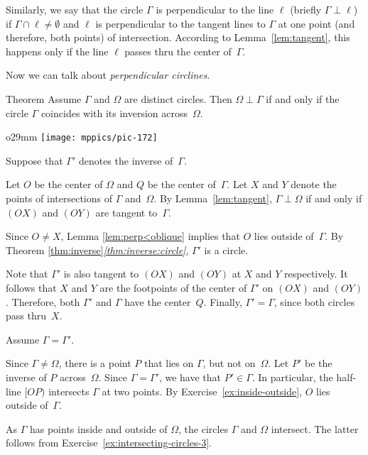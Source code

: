 Similarly, we say that the circle $\Gamma$ is perpendicular to the line $\ell$ (briefly $\Gamma\perp \ell$)
if $\Gamma\cap\ell\ne \emptyset$ and $\ell$ is perpendicular to the tangent lines to $\Gamma$ at one point (and therefore, both points) of intersection.
According to Lemma~\ref{lem:tangent}, 
this happens only if the line $\ell$ passes thru the center of~$\Gamma$.

Now we can talk about \emph{perpendicular circlines}.

\begin{thm}{Theorem}\label{thm:perp-inverse}
Assume $\Gamma$ and $\Omega$ are distinct circles. 
Then $\Omega\perp\Gamma$ if and only if the circle $\Gamma$ coincides with its inversion across~$\Omega$.
\end{thm}

\begin{wrapfigure}[7]{o}{29mm}
\vskip-4mm
\centering
\texttt{[image: mppics/pic-172]}
\end{wrapfigure}

Suppose that $\Gamma'$ denotes the inverse of~$\Gamma$.

Let $O$ be the center of $\Omega$
and $Q$ be the center of~$\Gamma$.
Let $X$ and $Y$ denote the points of intersections of  $\Gamma$ and~$\Omega$.
By Lemma~\ref{lem:tangent}, $\Gamma\perp\Omega$ if and only if $(OX)$ and $(OY)$ are tangent to~$\Gamma$.

Since $O\ne X$, Lemma \ref{lem:perp<oblique} implies that $O$ lies outside of~$\Gamma$.
By Theorem \ref{thm:inverse}\textit{\ref{thm:inverse:circle}}, $\Gamma'$ is a circle.

Note that $\Gamma'$ is also tangent to $(OX)$ and $(OY)$ at $X$ and $Y$ respectively. 
It follows that $X$ and $Y$ are the footpoints of the center of $\Gamma'$ on $(OX)$ and $(OY)$.
Therefore, both $\Gamma'$ and $\Gamma$ have the center~$Q$.
Finally, $\Gamma'=\Gamma$, since both circles pass thru~$X$.

Assume $\Gamma=\Gamma'$.

Since $\Gamma\ne \Omega$, there is a point $P$ that lies on $\Gamma$, but not on~$\Omega$.
Let $P'$ be the inverse of $P$ across~$\Omega$.
Since $\Gamma=\Gamma'$, we have that $P'\in \Gamma$.
In particular, the half-line $[OP)$ intersects $\Gamma$ at two points.
By Exercise~\ref{ex:inside-outside}, 
 $O$ lies outside of~$\Gamma$.

As $\Gamma$ has points inside and outside of $\Omega$,
the circles $\Gamma$ and $\Omega$ intersect.
The latter follows from Exercise~\ref{ex:intersecting-circles-3}.

